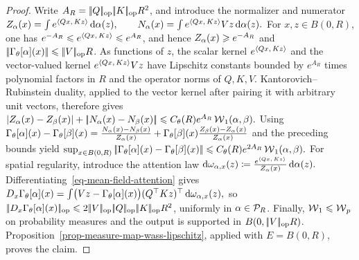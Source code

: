 \begin{proof}
Write \(A_R=|\!| Q |\!|_{\rm op}|\!| K |\!|_{\rm op}R^2\), and introduce the normalizer and numerator
\(Z_\alpha(x)=\int e^{\langle Qx,\,Kz\rangle}\,\mathrm{d}\alpha(z), \qquad N_\alpha(x)=\int e^{\langle Qx,\,Kz\rangle}Vz\,\mathrm{d}\alpha(z).\)
For \(x,z\in B(0,R)\), one has \(e^{-A_R}\leqslant e^{\langle Qx,\,Kz\rangle}\leqslant e^{A_R}\), and hence \(Z_\alpha(x)\geqslant e^{-A_R}\) and \(|\!| \Gamma_\theta[\alpha](x) |\!|\leqslant|\!| V |\!|_{\rm op}R\). As functions of \(z\), the scalar kernel \(e^{\langle Qx,\,Kz\rangle}\) and the vector-valued kernel \(e^{\langle Qx,\,Kz\rangle}Vz\) have Lipschitz constants bounded by \(e^{A_R}\) times polynomial factors in \(R\) and the operator norms of \(Q,K,V\). Kantorovich--Rubinstein duality, applied to the vector kernel after pairing it with arbitrary unit vectors, therefore gives
\(|Z_\alpha(x)-Z_\beta(x)| + |\!| N_\alpha(x)-N_\beta(x) |\!| \leqslant C_{\theta}(R)e^{A_R}\operatorname{\mathcal{W}}_1(\alpha,\beta).\)
Using
\(\Gamma_\theta[\alpha](x)-\Gamma_\theta[\beta](x) = \frac{N_\alpha(x)-N_\beta(x)}{Z_\alpha(x)} + \Gamma_\theta[\beta](x) \frac{Z_\beta(x)-Z_\alpha(x)}{Z_\alpha(x)}\)
and the preceding bounds yield
\(\sup_{x\in B(0,R)} |\!| \Gamma_\theta[\alpha](x)-\Gamma_\theta[\beta](x) |\!| \leqslant C_{\theta}(R)e^{2A_R}\operatorname{\mathcal{W}}_1(\alpha,\beta).\)
For spatial regularity, introduce the attention law
\(\mathrm{d}\omega_{\alpha,x}(z) \coloneqq \frac{e^{\langle Qx,\,Kz\rangle}}{Z_\alpha(x)}\,\mathrm{d}\alpha(z).\)
Differentiating~\eqref{eq-mean-field-attention} gives \(D_x\Gamma_\theta[\alpha](x) = \int \bigl(Vz-\Gamma_\theta[\alpha](x)\bigr) (Q^\top Kz)^\top \,\mathrm{d}\omega_{\alpha,x}(z),\)
so \(\norm{D_x\Gamma_\theta[\al](x)}_{\rm op}\leq2\norm{V}_{\rm op}\norm{Q}_{\rm op}\norm{K}_{\rm op}R^2\), uniformly in \(\alpha\in\mathcal P_R\). Finally, \(\operatorname{\mathcal{W}}_1\leqslant\operatorname{\mathcal{W}}_p\) on probability measures and the output is supported in \(B(0,|\!| V |\!|_{\rm op}R)\). Proposition~\ref{prop-measure-map-wass-lipschitz}, applied with \(E=B(0,R)\), proves the claim.
\end{proof}
